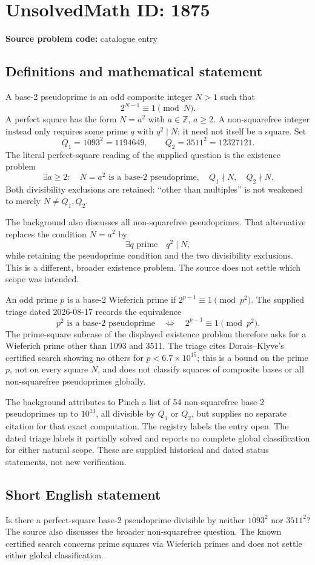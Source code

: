 \documentclass[11pt]{article}
\newcommand{\Z}{\mathbb{Z}}
\begin{document}
\section*{UnsolvedMath ID: 1875}
\textbf{Source problem code:} catalogue entry
\subsection{Definitions and mathematical statement}
A base-2 pseudoprime is an odd composite integer \(N>1\) such that
\[
2^{N-1}\equiv1\pmod N.
\]
A perfect square has the form \(N=a^2\) with \(a\in\Z\), \(a\geq2\). A non-squarefree integer instead only requires some prime \(q\) with \(q^2\mid N\); it need not itself be a square. Set
\[
Q_1=1093^2=1194649,\qquad Q_2=3511^2=12327121.
\]
The literal perfect-square reading of the supplied question is the existence problem
\[
\exists a\geq2:\quad N=a^2\text{ is a base-2 pseudoprime},\quad
Q_1\nmid N,\quad Q_2\nmid N.
\]
Both divisibility exclusions are retained: ``other than multiples'' is not weakened to merely \(N\ne Q_1,Q_2\).

The background also discusses all non-squarefree pseudoprimes. That alternative replaces the condition \(N=a^2\) by
\[
\exists q\text{ prime}\quad q^2\mid N,
\]
while retaining the pseudoprime condition and the two divisibility exclusions. This is a different, broader existence problem. The source does not settle which scope was intended.

An odd prime \(p\) is a base-2 Wieferich prime if \(2^{p-1}\equiv1\pmod{p^2}\). The supplied triage dated 2026-08-17 records the equivalence
\[
p^2\text{ is a base-2 pseudoprime}
\quad\Longleftrightarrow\quad
2^{p-1}\equiv1\pmod{p^2}.
\]
The prime-square subcase of the displayed existence problem therefore asks for a Wieferich prime other than 1093 and 3511. The triage cites Dorais--Klyve's certified search showing no others for \(p<6.7\times10^{15}\); this is a bound on the prime \(p\), not on every square \(N\), and does not classify squares of composite bases or all non-squarefree pseudoprimes globally.

The background attributes to Pinch a list of 54 non-squarefree base-2 pseudoprimes up to \(10^{13}\), all divisible by \(Q_1\) or \(Q_2\), but supplies no separate citation for that exact computation. The registry labels the entry open. The dated triage labels it partially solved and reports no complete global classification for either natural scope. These are supplied historical and dated status statements, not new verification.
\subsection{Short English statement}
Is there a perfect-square base-2 pseudoprime divisible by neither \(1093^2\) nor \(3511^2\)? The source also discusses the broader non-squarefree question. The known certified search concerns prime squares via Wieferich primes and does not settle either global classification.
\end{document}
